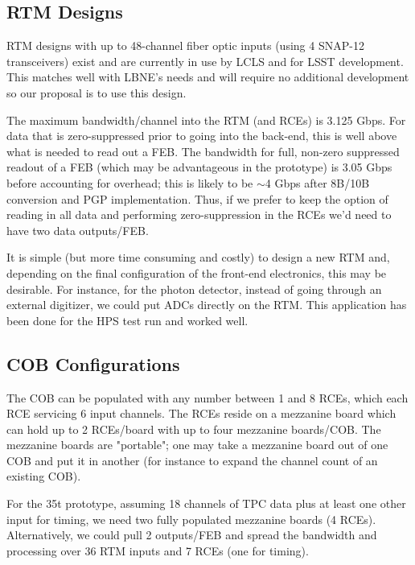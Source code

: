 \subsection{RTM Designs}

RTM designs with up to 48-channel fiber optic inputs (using 4 SNAP-12 transceivers) exist and are currently in use by LCLS and for LSST development. This matches well with LBNE's needs and will require no additional development so our proposal is to use this design.  

The maximum bandwidth/channel into the RTM (and RCEs) is 3.125 Gbps.  For data that is zero-suppressed prior to going into the back-end, this is well above what is needed to read out a FEB.    The bandwidth for full, non-zero suppressed readout of a FEB (which may be advantageous in the prototype) is 3.05 Gbps before accounting for overhead;  this is likely to be $\sim$4 Gbps after 8B/10B conversion and PGP implementation.  Thus, if we prefer to keep the option of reading in all data and performing zero-suppression in the RCEs we'd need to have two data outputs/FEB.   

It is simple (but more time consuming and costly) to design a new RTM and, depending on the final configuration of the front-end electronics, this may be desirable.  For instance, for the photon detector, instead of going through an external digitizer, we could put ADCs directly on the RTM.  This application has been done for the HPS test run and worked well.  


\subsection{COB Configurations}

The COB can be populated with any number between 1 and 8 RCEs, which each RCE servicing 6 input channels.  The RCEs reside on a mezzanine board which can hold up to 2 RCEs/board with up to four mezzanine boards/COB.  The mezzanine boards are "portable"; one may take a mezzanine board out of one COB and put it in another (for instance to expand the channel count of an existing COB).  

For the 35t prototype, assuming 18 channels of TPC data plus at least one other input for timing, we need two fully populated mezzanine boards (4 RCEs).  Alternatively, we could pull 2 outputs/FEB and spread the bandwidth and processing over 36 RTM inputs and 7 RCEs (one for timing). 



